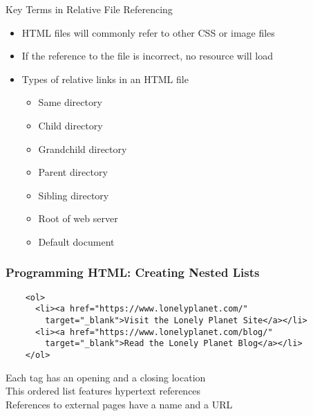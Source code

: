 \documentclass[14pt,aspectratio=169]{beamer}
\begin{document}
%
\begin{frame}{Key Terms in Relative File Referencing}
%
  \begin{itemize}
    \item HTML files will commonly refer to other CSS or image files
      \vspace*{-.2in}
    \item If the reference to the file is incorrect, no resource will load
      \vspace*{-.15in}
    \item Types of relative links in an HTML file
      \begin{itemize}
        \item Same directory
        \item Child directory
        \item Grandchild directory
        \item Parent directory
        \item Sibling directory
        \item Root of web server
        \item Default document
      \end{itemize}
  \end{itemize}
%
\end{frame}

%
\begin{frame}[fragile]
  \frametitle{Programming HTML: Creating Nested Lists}
  \normalsize
  \hspace*{-.55in}
  \begin{minipage}{6in}
    \vspace*{.25in}
    \begin{verbatim}
    <ol>
      <li><a href="https://www.lonelyplanet.com/"
        target="_blank">Visit the Lonely Planet Site</a></li>
      <li><a href="https://www.lonelyplanet.com/blog/"
        target="_blank">Read the Lonely Planet Blog</a></li>
    </ol>
    \end{verbatim}
  \end{minipage}
  \vspace*{.05in}
  \begin{center}
    \normalsize \noindent Each tag has an opening and a closing location \\
    \normalsize \noindent This ordered list features hypertext references \\
    \normalsize \noindent References to external pages have a name and a URL \\
  \end{center}
\end{frame}
\end{document}
